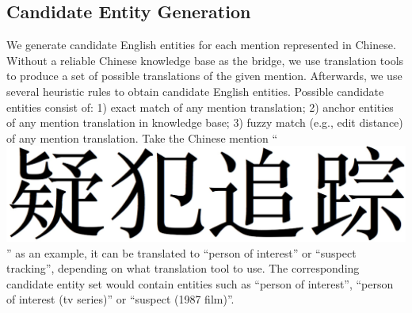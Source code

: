 \subsection{Candidate Entity Generation}
\label{sec:candgen}

We generate candidate English entities for each mention represented in Chinese.
Without a reliable Chinese knowledge base as the bridge,
we use translation tools to produce a set of possible translations of the given mention.
Afterwards, we use several heuristic rules to obtain candidate English entities.
Possible candidate entities consist of:
1) exact match of any mention translation;
2) anchor entities of any mention translation in knowledge base;
3) fuzzy match (e.g., edit distance) of any mention translation. 
Take the Chinese mention ``
\includegraphics[height=1.3\fontcharht\font`\B]{figures/yifan.png} 
'' as an example,
it can be translated  to ``person of interest'' or  ``suspect tracking'',
depending on what translation tool to use.
The corresponding candidate entity set would contain entities such as
``person of interest'', 
``person of interest (tv series)'' or ``suspect (1987 film)''.
